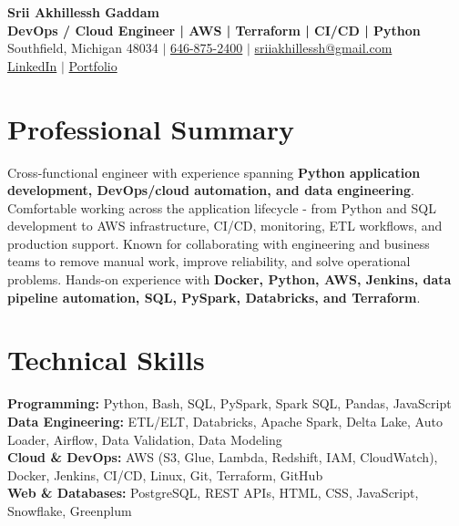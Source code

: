 \documentclass[letterpaper,10pt]{article}
\begin{document}
\fontsize{9.35pt}{10.45pt}\selectfont

\begin{center}
    {\LARGE \textbf{Srii Akhillessh Gaddam}} \\[-1pt]
    \textbf{DevOps / Cloud Engineer | AWS | Terraform | CI/CD | Python} \\[2pt]
    Southfield, Michigan 48034 $|$
    \href{tel:6468752400}{646-875-2400} $|$
    \href{mailto:sriiakhillessh@gmail.com}{sriiakhillessh@gmail.com} \\[1pt]
    \href{https://www.linkedin.com/in/srii-akhiilessh-gaddam-b48668191/}{LinkedIn} $|$
    \href{https://sriiakhillesshg.github.io/portfolio/}{Portfolio}
\end{center}
\vspace{-8pt}

\section{Professional Summary}
\small{Cross-functional engineer with experience spanning \textbf{Python application development, DevOps/cloud automation, and data engineering}. Comfortable working across the application lifecycle - from Python and SQL development to AWS infrastructure, CI/CD, monitoring, ETL workflows, and production support. Known for collaborating with engineering and business teams to remove manual work, improve reliability, and solve operational problems. Hands-on experience with \textbf{Docker, Python, AWS, Jenkins, data pipeline automation, SQL, PySpark, Databricks, and Terraform}.}

\section{Technical Skills}
\small{
\textbf{Programming:} Python, Bash, SQL, PySpark, Spark SQL, Pandas, JavaScript \\
\textbf{Data Engineering:} ETL/ELT, Databricks, Apache Spark, Delta Lake, Auto Loader, Airflow, Data Validation, Data Modeling \\
\textbf{Cloud \& DevOps:} AWS (S3, Glue, Lambda, Redshift, IAM, CloudWatch), Docker, Jenkins, CI/CD, Linux, Git, Terraform, GitHub \\
\textbf{Web \& Databases:} PostgreSQL, REST APIs, HTML, CSS, JavaScript, Snowflake, Greenplum
}
\end{document}
